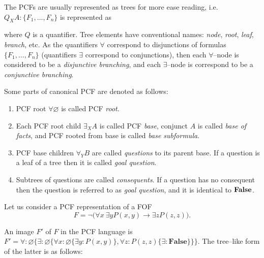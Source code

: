 \documentclass[a4paper,12pt]{article}
\begin{document}
The PCFs are usually represented as trees for more ease reading, i.e. $Q_XA\colon\{F_1,\ldots,F_n\}$ is represented as
\begin{center}
\end{center}
\noindent where $Q$ is a quantifier. Tree elements have conventional names: \emph{node}, \emph{root}, \emph{leaf}, \emph{branch}, etc. As the quantifiers $\forall$ correspond to disjunctions of formulas $\{F_1,\ldots,F_n\}$ (quantifiers $\exists$ correspond to  conjunctions), then each $\forall$--node is considered to be a {\em disjunctive branching}, and each $\exists$--node is correspond to be a {\em conjunctive branching}.

Some parts of canonical PCF are denoted as follows:
\begin{enumerate}
\item PCF root $\forall \varnothing$ is called PCF {\em root}.
\item Each PCF root child $\exists_XA$ is called PCF {\em base}, conjunct $A$ is called {\em base of facts}, and PCF rooted from base is called {\em base subformula}.
\item PCF base children $\forall_YB$ are called {\em questions} to its parent base.  If a question is a leaf of a tree then it is called {\em goal question}.
\item Subtrees of questions are called {\em consequents}.  If a question has no consequent then the question is referred to as \emph{goal question}, and it is identical to $\text{\textbf{False}}$.
\end{enumerate}


\begin{example}
Let us consider a PCF representation of a FOF
$$F= \neg\bigl(\forall x\:\exists y P(x,y)\rightarrow \exists z P(z,z)\bigr).$$
\end{example}
An image $F'$ of $F$ in the PCF language is $F' = \forall\colon \varnothing\{\exists\colon\varnothing\{\forall x\colon\varnothing\{\exists y\colon P(x,y)\}, \forall z\colon P(z,z)\{\exists\colon\boldsymbol{False}\}\}\}.$
The tree--like form of the latter is as follows:
\begin{center}
\end{center}
\end{document}
